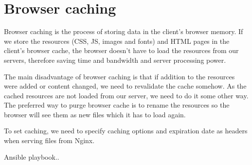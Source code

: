 \section{Browser caching}

Browser caching is the process of storing data in the client's browser memory. If we store the resources (CSS, JS, images and fonts) and HTML pages in the client's browser cache, the browser doesn't have to load the resources from our servers, therefore saving time and bandwidth and server processing power.

The main disadvantage of browser caching is that if addition to the resources were added or content changed, we need to revalidate the cache somehow. As the cached resources are not loaded from our server, we need to do it some other way. The preferred way to purge browser cache is to rename the resources so the browser will see them as new files which it has to load again.

To set caching, we need to specify caching options and expiration date as headers when serving files from Nginx. 

Ansible playbook..
